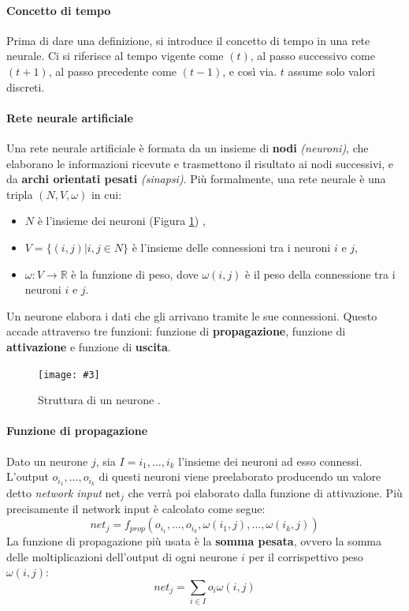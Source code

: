 \documentclass[12pt, twoside, letterpaper]{report}
\newcommand{\img}[4] {
	\begin{figure}
		\centering
		\texttt{[image: \#3]}\\
		\caption{#1}
		\label{fig:#4}
	\end{figure}
}
\begin{document}
			\paragraph{Concetto di tempo} Prima di dare una definizione, si introduce il concetto di tempo in una rete neurale. Ci si riferisce al tempo vigente come $(t)$, al passo successivo come $(t+1)$, al passo precedente come $(t-1)$, e così via. $t$ assume solo valori discreti.
			
			\paragraph{Rete neurale artificiale} Una rete neurale artificiale è formata da un insieme di \textbf{nodi} \textit{(neuroni)}, che elaborano le informazioni ricevute e trasmettono il risultato ai nodi successivi, e da \textbf{archi orientati pesati} \textit{(sinapsi)}. Più formalmente, una rete neurale è una tripla $(N,V, \omega)$ in cui:
			\begin{itemize}
				\item $N$ è l'insieme dei neuroni (Figura \ref{fig:neurone}) ,
				\item $V = \{(i,j) | i,j \in N\}$ è l'insieme delle connessioni tra i neuroni $i$ e $j$, 
				\item $\omega: V \rightarrow \mathbb{R}$ è la funzione di peso, dove $\omega(i,j)$ è il peso della connessione tra i neuroni $i$ e $j$.  
			\end{itemize}
			Un neurone elabora i dati che gli arrivano tramite le sue connessioni. Questo accade attraverso tre funzioni: funzione di \textbf{propagazione}, funzione di \textbf{attivazione} e funzione di \textbf{uscita}.
			
			\img{Struttura di un neurone \cite{kriesel}.}{0.4}{neurone.png}{neurone} 
			
			 \paragraph{Funzione di propagazione} Dato un neurone $j$, sia $I = i_1, \dots, i_k$ l'insieme dei neuroni ad esso connessi. L'output $o_{i_1}, \dots, o_{i_k}$ di questi neuroni viene preelaborato producendo un valore detto \textit{network input} net$_j$  che verrà poi elaborato dalla funzione di attivazione. Più precisamente il network input è calcolato come segue: $$net_j = f_{prop}(o_{i_1}, \dots, o_{i_k}, \omega(i_1,j), \dots, \omega(i_k,j))$$
			 	La funzione di propagazione più usata è la \textbf{somma pesata}, ovvero la somma delle moltiplicazioni dell'output di ogni neurone $i$ per il corrispettivo peso $\omega(i,j)$: $$net_j = \sum_{i \in I} o_i \omega(i,j)$$
			 	
\end{document}
